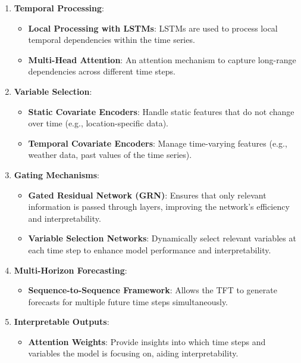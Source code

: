 \documentclass[
]{article}
\providecommand{\tightlist}{%
  \setlength{\itemsep}{0pt}\setlength{\parskip}{0pt}}
\begin{document}
\begin{enumerate}
\def\labelenumi{\arabic{enumi}.}
\tightlist
\item
  \textbf{Temporal Processing}:

  \begin{itemize}
  \tightlist
  \item
    \textbf{Local Processing with LSTMs}: LSTMs are used to process
    local temporal dependencies within the time series.
  \item
    \textbf{Multi-Head Attention}: An attention mechanism to capture
    long-range dependencies across different time steps.
  \end{itemize}
\item
  \textbf{Variable Selection}:

  \begin{itemize}
  \tightlist
  \item
    \textbf{Static Covariate Encoders}: Handle static features that do
    not change over time (e.g., location-specific data).
  \item
    \textbf{Temporal Covariate Encoders}: Manage time-varying features
    (e.g., weather data, past values of the time series).
  \end{itemize}
\item
  \textbf{Gating Mechanisms}:

  \begin{itemize}
  \tightlist
  \item
    \textbf{Gated Residual Network (GRN)}: Ensures that only relevant
    information is passed through layers, improving the network's
    efficiency and interpretability.
  \item
    \textbf{Variable Selection Networks}: Dynamically select relevant
    variables at each time step to enhance model performance and
    interpretability.
  \end{itemize}
\item
  \textbf{Multi-Horizon Forecasting}:

  \begin{itemize}
  \tightlist
  \item
    \textbf{Sequence-to-Sequence Framework}: Allows the TFT to generate
    forecasts for multiple future time steps simultaneously.
  \end{itemize}
\item
  \textbf{Interpretable Outputs}:

  \begin{itemize}
  \tightlist
  \item
    \textbf{Attention Weights}: Provide insights into which time steps
    and variables the model is focusing on, aiding interpretability.
  \end{itemize}
\end{enumerate}
\end{document}
